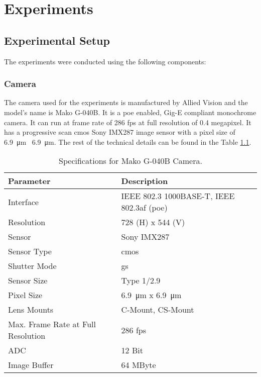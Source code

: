 \chapter{Experiments}

\section{Experimental Setup}

The experiments were conducted using the following components:

\subsection{Camera}
    The camera used for the experiments is manufactured by Allied Vision and the model's name is Mako G-040B. It is a \gls{poe} enabled, Gig-E compliant monochrome camera. It can run at frame rate of 286 \gls{fps} at full resolution of 0.4 megapixel. It has a progressive scan \gls{cmos} Sony IMX287 image sensor with a pixel size of \SI{6.9}{\micro\meter} \times \ \SI{6.9}{\micro\meter}. The rest of the technical details can be found in the Table \ref{table:camera_specs}.

    \begin{table}[h]
        \centering
        \footnotesize
        \renewcommand{\arraystretch}{1.2}
        \begin{tabular}{p{6cm}p{7cm}}
            \toprule
            \textbf{Parameter} & \textbf{Description} \\
            \midrule
            Interface & IEEE 802.3 1000BASE-T, IEEE 802.3af (\gls{poe})\\
            Resolution & 728 (H) x 544 (V)\\
            Sensor & Sony IMX287\\
            Sensor Type & \gls{cmos}\\
            Shutter Mode & \gls{gs}\\
            Sensor Size & Type 1/2.9\\
            Pixel Size & \SI{6.9}{\micro\meter} x \SI{6.9}{\micro\meter}\\
            Lens Mounts & C-Mount, CS-Mount\\
            Max. Frame Rate at Full Resolution & 286 \gls{fps}\\
            ADC & 12 Bit\\
            Image Buffer & 64 MByte\\
            \bottomrule
        \end{tabular}
        \caption{Specifications for Mako G-040B Camera. \cite{mako_camera}}
        \label{table:camera_specs}
    \end{table}

